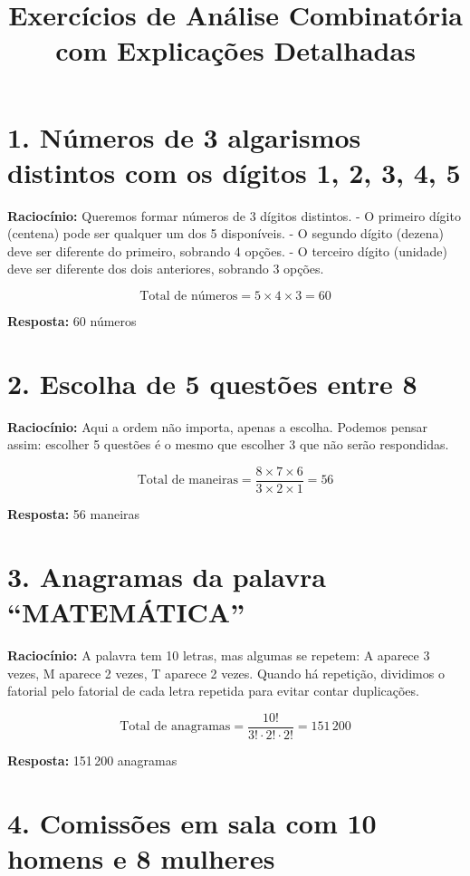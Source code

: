 \documentclass[12pt,a4paper]{article}
\title{Exercícios de Análise Combinatória \\ com Explicações Detalhadas}
\author{}
\date{}
\begin{document}
\maketitle

\section*{1. Números de 3 algarismos distintos com os dígitos 1, 2, 3, 4, 5}

\textbf{Raciocínio:}  
Queremos formar números de 3 dígitos distintos.  
- O primeiro dígito (centena) pode ser qualquer um dos 5 disponíveis.  
- O segundo dígito (dezena) deve ser diferente do primeiro, sobrando 4 opções.  
- O terceiro dígito (unidade) deve ser diferente dos dois anteriores, sobrando 3 opções.  

\[
\text{Total de números} = 5 \times 4 \times 3 = 60
\]

\textbf{Resposta:} 60 números

\section*{2. Escolha de 5 questões entre 8}

\textbf{Raciocínio:}  
Aqui a ordem não importa, apenas a escolha. Podemos pensar assim: escolher 5 questões é o mesmo que escolher 3 que não serão respondidas.  

\[
\text{Total de maneiras} = \frac{8 \times 7 \times 6}{3 \times 2 \times 1} = 56
\]

\textbf{Resposta:} 56 maneiras

\section*{3. Anagramas da palavra ``MATEMÁTICA''}

\textbf{Raciocínio:}  
A palavra tem 10 letras, mas algumas se repetem: A aparece 3 vezes, M aparece 2 vezes, T aparece 2 vezes.  
Quando há repetição, dividimos o fatorial pelo fatorial de cada letra repetida para evitar contar duplicações.  

\[
\text{Total de anagramas} = \frac{10!}{3! \cdot 2! \cdot 2!} = 151\,200
\]

\textbf{Resposta:} 151\,200 anagramas

\section*{4. Comissões em sala com 10 homens e 8 mulheres}
\end{document}
